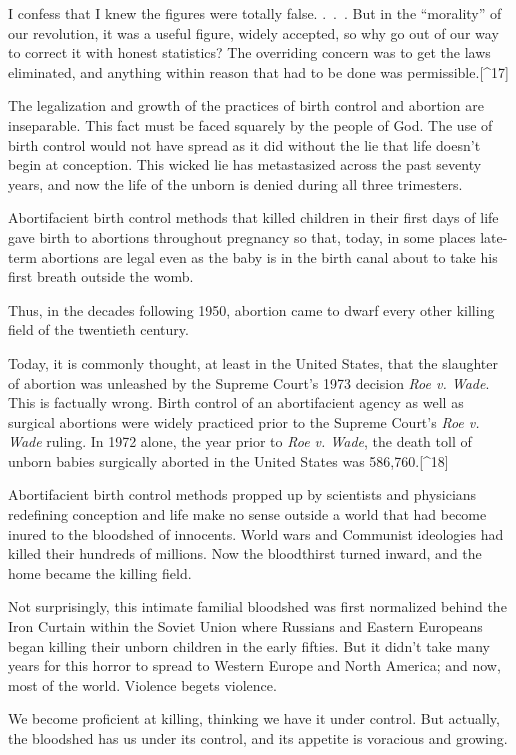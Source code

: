 \documentclass[
]{book}
\begin{document}
I confess that I knew the figures were totally false. .~.~. But in the ``morality'' of our revolution, it was a useful figure, widely accepted, so why go out of our way to correct it with honest statistics? The overriding concern was to get the laws eliminated, and anything within reason that had to be done was permissible.{[}\^{}17{]}

The legalization and growth of the practices of birth control and abortion are inseparable. This fact must be faced squarely by the people of God. The use of birth control would not have spread as it did without the lie that life doesn't begin at conception. This wicked lie has metastasized across the past seventy years, and now the life of the unborn is denied during all three trimesters.

Abortifacient birth control methods that killed children in their first days of life gave birth to abortions throughout pregnancy so that, today, in some places late-term abortions are legal even as the baby is in the birth canal about to take his first breath outside the womb.

Thus, in the decades following 1950, abortion came to dwarf every other killing field of the twentieth century.

Today, it is commonly thought, at least in the United States, that the slaughter of abortion was unleashed by the Supreme Court's 1973 decision \emph{Roe v. Wade}. This is factually wrong. Birth control of an abortifacient agency as well as surgical abortions were widely practiced prior to the Supreme Court's \emph{Roe v. Wade} ruling. In 1972 alone, the year prior to \emph{Roe v. Wade}, the death toll of unborn babies surgically aborted in the United States was 586,760.{[}\^{}18{]}

Abortifacient birth control methods propped up by scientists and physicians redefining conception and life make no sense outside a world that had become inured to the bloodshed of innocents. World wars and Communist ideologies had killed their hundreds of millions. Now the bloodthirst turned inward, and the home became the killing field.

Not surprisingly, this intimate familial bloodshed was first normalized behind the Iron Curtain within the Soviet Union where Russians and Eastern Europeans began killing their unborn children in the early fifties. But it didn't take many years for this horror to spread to Western Europe and North America; and now, most of the world. Violence begets violence.

We become proficient at killing, thinking we have it under control. But actually, the bloodshed has us under its control, and its appetite is voracious and growing.
\end{document}
